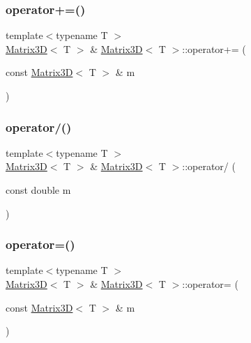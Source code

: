 \mbox{\label{classMatrix3D_a10b206ad9106931f7aa46a7b4d45c851}} 
\subsubsection{\texorpdfstring{operator+=()}{operator+=()}}
{\footnotesize\ttfamily template$<$typename T $>$ \\
\mbox{\hyperlink{classMatrix3D}{Matrix3D}}$<$ T $>$ \& \mbox{\hyperlink{classMatrix3D}{Matrix3D}}$<$ T $>$\+::operator+= (\begin{DoxyParamCaption}\item[{const \mbox{\hyperlink{classMatrix3D}{Matrix3D}}$<$ T $>$ \&}]{m }\end{DoxyParamCaption})}

\mbox{\label{classMatrix3D_ad45bff7f2159a4ba0aa4546635e8a73f}} 
\subsubsection{\texorpdfstring{operator/()}{operator/()}}
{\footnotesize\ttfamily template$<$typename T $>$ \\
\mbox{\hyperlink{classMatrix3D}{Matrix3D}}$<$ T $>$ \& \mbox{\hyperlink{classMatrix3D}{Matrix3D}}$<$ T $>$\+::operator/ (\begin{DoxyParamCaption}\item[{const double}]{m }\end{DoxyParamCaption})}

\mbox{\label{classMatrix3D_a0e84724f089ae3478283ea81d0b866af}} 
\subsubsection{\texorpdfstring{operator=()}{operator=()}}
{\footnotesize\ttfamily template$<$typename T $>$ \\
\mbox{\hyperlink{classMatrix3D}{Matrix3D}}$<$ T $>$ \& \mbox{\hyperlink{classMatrix3D}{Matrix3D}}$<$ T $>$\+::operator= (\begin{DoxyParamCaption}\item[{const \mbox{\hyperlink{classMatrix3D}{Matrix3D}}$<$ T $>$ \&}]{m }\end{DoxyParamCaption})}

